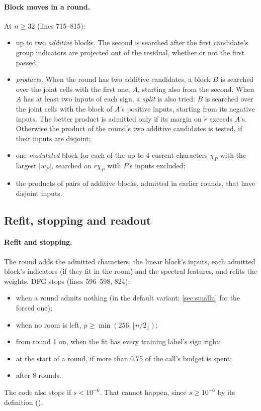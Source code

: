 \paragraph{Block moves in a round.} At $n\ge32$ (lines 715--815):
\begin{itemize}
\item up to two \emph{additive} blocks. The second is searched after the first candidate's group indicators are projected out of the residual, whether or not the first passed;
\item \emph{products}. When the round has two additive candidates, a block $B$ is searched over the joint cells with the first one, $A$, starting also from the second. When $A$ has at least two inputs of each sign, a \emph{split} is also tried: $B$ is searched over the joint cells with the block of $A$'s positive inputs, starting from its negative inputs. The better product is admitted only if its margin on $\tilde r$ exceeds $A$'s. Otherwise the product of the round's two additive candidates is tested, if their inputs are disjoint;
\item one \emph{modulated} block for each of the up to 4 current characters $\chi_P$ with the largest $|w_P|$, searched on $r\chi_P$ with $P$'s inputs excluded;
\item the products of pairs of additive blocks, admitted in earlier rounds, that have disjoint inputs.
\end{itemize}

\subsection{Refit, stopping and readout}\label{app:learner-stop}

\paragraph{Refit and stopping.} The round adds the admitted characters, the linear block's inputs, each admitted block's indicators (if they fit in the room) and the spectral features, and refits the weights. DFG stops (lines 596--598, 824):
\begin{itemize}
\item when a round admits nothing (in the default variant; \cref{sec:smalln} for the forced one);
\item when no room is left, $p\ge\min(256,\lfloor n/2\rfloor)$;
\item from round 1 on, when the fit has every training label's sign right;
\item at the start of a round, if more than 0.75 of the call's budget is spent;
\item after 8 rounds.
\end{itemize}
The code also stops if $s<10^{-6}$. That cannot happen, since $s\ge10^{-6}$ by its definition ().

